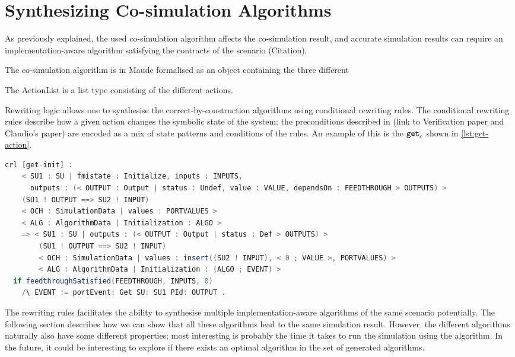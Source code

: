 \section{Synthesizing Co-simulation Algorithms}
As previously explained, the used co-simulation algorithm affects the co-simulation result, and accurate simulation results can require an implementation-aware algorithm satisfying the contracts of the scenario (Citation).

The co-simulation algorithm is in Maude formalised as an object containing the three different 

The ActionList is a list type consisting of the different actions.

Rewriting logic allows one to synthesise the correct-by-construction algorithms using conditional rewriting rules.
The conditional rewriting rules describe how a given action changes the symbolic state of the system; the preconditions described in (link to Verification paper and Claudio's paper) are encoded as a mix of state patterns and conditions of the rules.
An example of this is the $\mathtt{get}_{c}$ shown in \ref{lst:get-action}.

\begin{lstlisting}[caption={The get-action rewriting rule.},label={lst:get-action},language=Java]
    crl [get-init] :
    < SU1 : SU | fmistate : Initialize, inputs : INPUTS, 
      outputs : (< OUTPUT : Output | status : Undef, value : VALUE, dependsOn : FEEDTHROUGH > OUTPUTS) > 
    (SU1 ! OUTPUT ==> SU2 ! INPUT)
    < OCH : SimulationData | values : PORTVALUES > 
    < ALG : AlgorithmData | Initialization : ALGO >
    => < SU1 : SU | outputs : (< OUTPUT : Output | status : Def > OUTPUTS) > 
        (SU1 ! OUTPUT ==> SU2 ! INPUT)
        < OCH : SimulationData | values : insert((SU2 ! INPUT), < 0 ; VALUE >, PORTVALUES) >  
        < ALG : AlgorithmData | Initialization : (ALGO ; EVENT) >
  if feedthroughSatisfied(FEEDTHROUGH, INPUTS, 0)
    /\ EVENT := portEvent: Get SU: SU1 PId: OUTPUT . 
\end{lstlisting}



The rewriting rules facilitates the ability to synthesise multiple implementation-aware algorithms of the same scenario potentially.
The following section describes how we can show that all these algorithms lead to the same simulation result.
However, the different algorithms naturally also have some different properties; most interesting is probably the time it takes to run the simulation using the algorithm. 
In the future, it could be interesting to explore if there exists an optimal algorithm in the set of generated algorithms.

